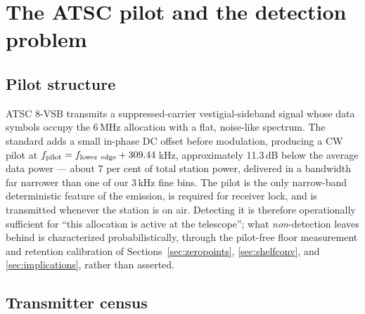 \section{The ATSC pilot and the detection problem}
\label{sec:pilot}

\subsection{Pilot structure}

ATSC 8-VSB transmits a suppressed-carrier vestigial-sideband signal whose
data symbols occupy the 6\,MHz allocation with a flat, noise-like spectrum.
The standard adds a small in-phase DC offset before modulation, producing a
CW pilot at $f_{\rm pilot} = f_{\rm lower\ edge} + 309.44$\,kHz,
approximately 11.3\,dB below the average data power \citep{atsc_a53} ---
about 7 per cent of total station power, delivered in a bandwidth far
narrower than one of our 3\,kHz fine bins. The pilot is the only
narrow-band deterministic feature of the emission, is required for receiver
lock, and is transmitted whenever the station is on air. Detecting it is
therefore operationally sufficient for ``this allocation is active at the
telescope''; what \emph{non}-detection leaves behind is characterized
probabilistically, through the pilot-free floor measurement and retention
calibration of Sections~\ref{sec:zeropoints}, \ref{sec:shelfconv}, and
\ref{sec:implications}, rather than asserted.

\subsection{Transmitter census}

